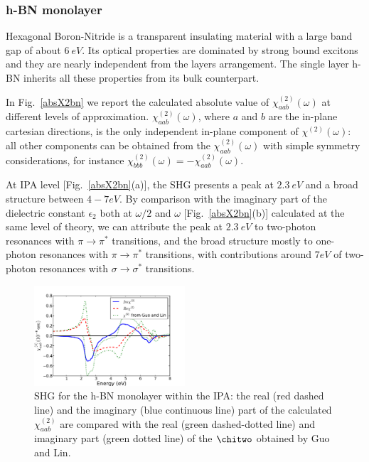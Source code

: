 \subsubsection{h-BN monolayer}
Hexagonal Boron-Nitride is a transparent insulating material with a large band gap of about $6~eV$. Its optical properties are dominated by strong bound excitons and they are nearly independent from the layers arrangement.\cite{PhysRevLett.96.126104,PhysRevLett.100.189701} The single layer h-BN inherits all these properties from its bulk counterpart.

In Fig.~\ref{absX2bn} we report the calculated absolute value of $\chi^{(2)}_{aab} (\omega)$ at different levels of approximation. $\chi^{(2)}_{aab} (\omega)$, where $a$ and $b$ are the in-plane cartesian directions, is the only independent in-plane component of $\chi^{(2)} (\omega)$: all other components can be obtained from the $\chi^{(2)}_{aab} (\omega)$ with simple symmetry considerations, for instance $\chi^{(2)}_{bbb} (\omega)=-\chi^{(2)}_{aab} (\omega)$. 

At IPA level [Fig.~\ref{absX2bn}(a)], the SHG presents a peak at $2.3~eV$ and a broad structure between $4 - 7 eV$. By comparison with the imaginary part of the dielectric constant $\epsilon_2$ both at $\omega/2$ and  $\omega$ [Fig.~\ref{absX2bn}(b)] calculated at the same level of theory, we can attribute the peak at $2.3~eV$ to two-photon resonances with $\pi \to \pi^*$ transitions, and the broad structure mostly to one-photon resonances with $\pi \to \pi^*$ transitions, with contributions around $7 eV$ of two-photon resonances with $\sigma \to \sigma^*$ transitions.
 
\begin{figure}[hb]
\centering
\includegraphics[width=0.5\textwidth]{Figures/IPX2}
\caption{\footnotesize{SHG for the h-BN monolayer within the IPA: the real (red dashed line) and the imaginary (blue continuous line) part of the calculated $\chi^{(2)}_{aab}$ are compared with the real (green dashed-dotted line) and imaginary part (green dotted line) of the $\chitwo$ obtained by Guo and Lin.\cite{guo2005second}}\label{X2bn}}
\end{figure}


